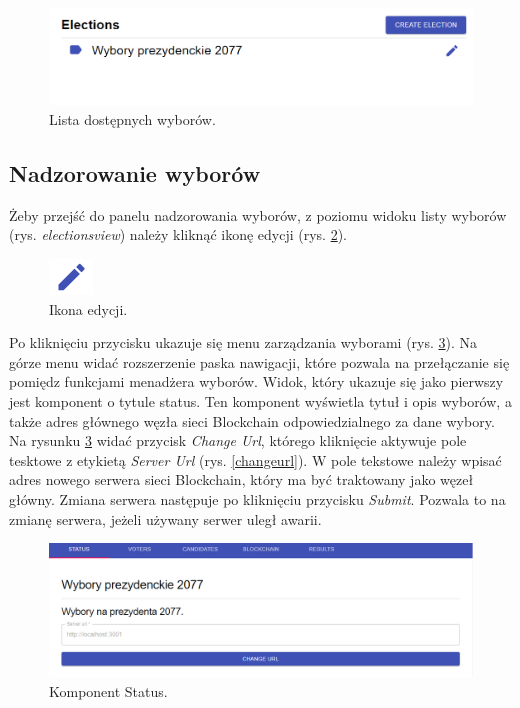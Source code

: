 \documentclass[a4paper,12pt]{book}
\begin{document}
\begin{figure}[h]
	\centering
	\includegraphics[width=\textwidth]{images/electionsview.png}
	\caption{Lista dostępnych wyborów.}\label{electionsview}
\end {figure}

\subsection{Nadzorowanie wyborów}

Żeby przejść do panelu nadzorowania wyborów, z poziomu widoku listy wyborów (rys. \textit{electionsview}) należy kliknąć ikonę edycji (rys. \ref{penicon}).

\begin{figure}[h]
	\centering
	\includegraphics{images/penicon.png}
	\caption{Ikona edycji.}\label{penicon}
\end {figure}

Po kliknięciu przycisku ukazuje się menu zarządzania wyborami (rys. \ref{electionmanager}). Na górze menu widać rozszerzenie paska nawigacji, które pozwala na przełączanie się pomiędz funkcjami menadżera wyborów. Widok, który ukazuje się jako pierwszy jest komponent o tytule status. Ten komponent wyświetla tytuł i opis wyborów, a także adres głównego węzła sieci Blockchain odpowiedzialnego za dane wybory. Na rysunku \ref{electionmanager} widać przycisk \textit{Change Url}, którego kliknięcie aktywuje pole tesktowe z etykietą \textit{Server Url} (rys. \ref{changeurl}). W pole tekstowe należy wpisać adres nowego serwera sieci Blockchain, który ma być traktowany jako węzeł główny. Zmiana serwera następuje po kliknięciu przycisku \textit{Submit}. Pozwala to na zmianę serwera, jeżeli używany serwer uległ awarii.

\begin{figure}[h]
	\centering
	\includegraphics[width=\textwidth]{images/electionmanager.png}
	\caption{Komponent Status.}\label{electionmanager}
\end {figure}
\end{document}
